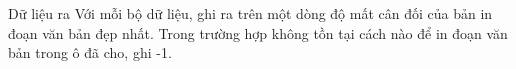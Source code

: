 Dữ liệu ra
Với mỗi bộ dữ liệu, ghi ra trên một dòng độ mất cân đối của bản in đoạn văn bản đẹp nhất. Trong trường hợp không tồn tại cách nào để in đoạn văn bản trong ô đã cho, ghi -1.
